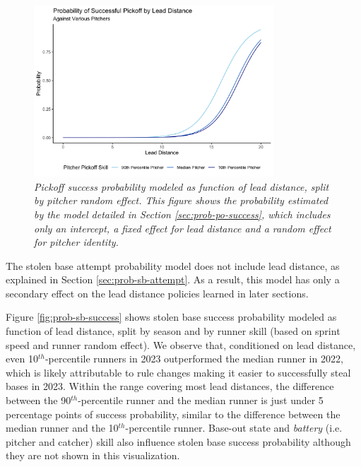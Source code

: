 \documentclass{article}
\begin{document}
      \begin{figure}
        \centering
        \includegraphics[width = 0.8\textwidth]{../../output/figures/prob_pickoff_success.png}
        \caption{
          \it Pickoff success probability modeled as function of lead distance, split by pitcher random effect. This figure shows the probability estimated by the model detailed in Section \ref{sec:prob-po-success}, which includes only an intercept, a fixed effect for lead distance and a random effect for pitcher identity.
        }
        \label{fig:prob-pickoff-success}
      \end{figure}

      The stolen base attempt probability model does not include lead distance, as explained in Section \ref{sec:prob-sb-attempt}. As a result, this model has only a secondary effect on the lead distance policies learned in later sections.

      Figure \ref{fig:prob-sb-success} shows stolen base success probability modeled as function of lead distance, split by season and by runner skill (based on sprint speed and runner random effect). We observe that, conditioned on lead distance, even 10$^{th}$-percentile runners in 2023 outperformed the median runner in 2022, which is likely attributable to rule changes making it easier to successfully steal bases in 2023. Within the range covering most lead distances, the difference between the 90$^{th}$-percentile runner and the median runner is just under 5 percentage points of success probability, similar to the difference between the median runner and the 10$^{th}$-percentile runner. Base-out state and {\it battery} (i.e. pitcher and catcher) skill also influence stolen base success probability although they are not shown in this visualization.
      
\end{document}

